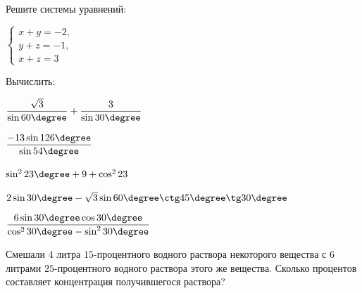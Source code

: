 \begin{listofex}
	\item Решите системы уравнений:
	\begin{enumcols}[itemcolumns=3]
		\item {}
		\item {}
		\item \( \left\{
		\begin{array}{l}
			x+y=-2,\\
			y+z=-1,\\
			x+z=3
		\end{array}
		\right. \)
		\end{enumcols}
			\item Вычислить:
	\begin{enumcols}[itemcolumns=2]
		\item \( \dfrac{\sqrt{3}}{\sin60\degree}+\dfrac{3}{\sin30\degree} \)
		\item \( \dfrac{-13\sin126\degree}{\sin54\degree} \)
		\item \( \sin^223\degree+9+\cos^223 \)
		\item \( 2\sin30\degree-\sqrt{3}\sin60\degree\ctg45\degree\tg30\degree\)
		\item \( \dfrac{6\sin30\degree\cos30\degree}{\cos^230\degree-\sin^230\degree} \)
	\end{enumcols}
	\item {}
	\item {}
	\item {}
	\item {}
	\item {}
	\item Смешали \( 4 \) литра \( 15 \)-процентного водного раствора некоторого вещества с \( 6 \) литрами	\( 25 \)-процентного водного раствора этого же вещества. Сколько процентов составляет концентрация получившегося раствора?
	\item 
\end{listofex}
%	
%	
